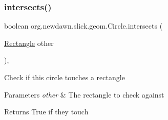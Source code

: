 \subsubsection{\texorpdfstring{intersects()}{intersects()}\hspace{0.1cm}{\footnotesize\ttfamily [2/3]}}
{\footnotesize\ttfamily boolean org.\+newdawn.\+slick.\+geom.\+Circle.\+intersects (\begin{DoxyParamCaption}\item[{\mbox{\hyperlink{classorg_1_1newdawn_1_1slick_1_1geom_1_1_rectangle}{Rectangle}}}]{other }\end{DoxyParamCaption})\hspace{0.3cm}{\ttfamily [inline]}, {\ttfamily [private]}}

Check if this circle touches a rectangle


\begin{DoxyParams}{Parameters}
{\em other} & The rectangle to check against \\
\hline
\end{DoxyParams}
\begin{DoxyReturn}{Returns}
True if they touch 
\end{DoxyReturn}

